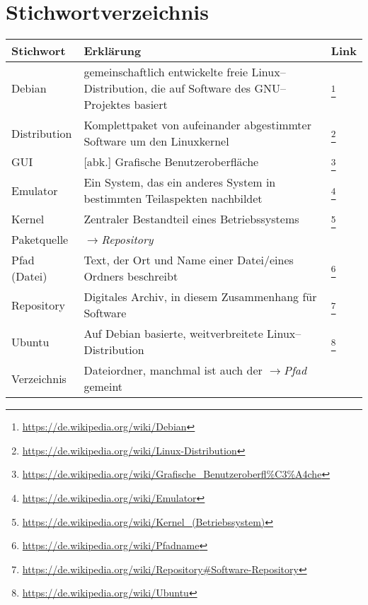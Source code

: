 \pagebreak
\section{Stichwortverzeichnis}

\begin{tabularx}{1\textwidth}{lXl}
	\textbf{Stichwort} & \textbf{Erklärung} & \textbf{Link} \\
	\hline
	Debian & gemeinschaftlich entwickelte freie Linux--Distribution, die auf Software des GNU--Projektes basiert & \footnote{\url{https://de.wikipedia.org/wiki/Debian}}\\
	Distribution & Komplettpaket von aufeinander abgestimmter Software um den Linuxkernel & \footnote{\url{https://de.wikipedia.org/wiki/Linux-Distribution}}\\
	GUI & [abk.] Grafische Benutzeroberfläche & \footnote{\url{https://de.wikipedia.org/wiki/Grafische\_Benutzeroberfl\%C3\%A4che}}\\
	Emulator & Ein System, das ein anderes System in bestimmten Teilaspekten nachbildet & \footnote{\url{https://de.wikipedia.org/wiki/Emulator}}\\
	Kernel & Zentraler Bestandteil eines Betriebssystems & \footnote{\url{https://de.wikipedia.org/wiki/Kernel\_(Betriebssystem)}}\\
	Paketquelle & \(\rightarrow\)\emph{Repository} &\\
	Pfad (Datei) & Text, der Ort und Name einer Datei/eines Ordners beschreibt & \footnote{\url{https://de.wikipedia.org/wiki/Pfadname}}\\
	Repository & Digitales Archiv, in diesem Zusammenhang für Software & \footnote{\url{https://de.wikipedia.org/wiki/Repository\#Software-Repository}}\\
	Ubuntu & Auf Debian basierte, weitverbreitete Linux--Distribution & \footnote{\url{https://de.wikipedia.org/wiki/Ubuntu}}\\
	Verzeichnis & Dateiordner, manchmal ist auch der \(\rightarrow\)\emph{Pfad} gemeint & \\
\end{tabularx}